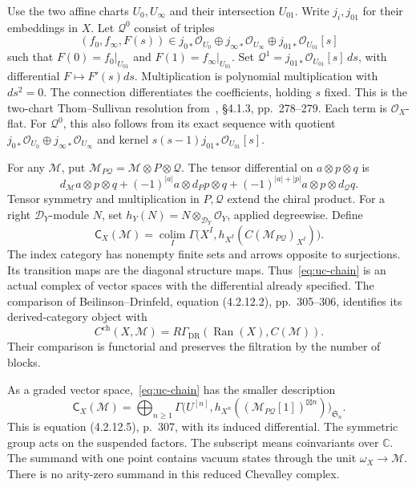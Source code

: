 Use the two affine charts $U_0,U_\infty$ and their intersection $U_{01}$.
Write $j_i,j_{01}$ for their embeddings in $X$.
Let $\mathcal Q^0$ consist of triples
\[
 (f_0,f_\infty,F(s))\in
 j_{0*}\mathcal O_{U_0}\oplus j_{\infty*}\mathcal O_{U_\infty}
 \oplus j_{01*}\mathcal O_{U_{01}}[s]
\]
such that $F(0)=f_0|_{U_{01}}$ and $F(1)=f_\infty|_{U_{01}}$.
Set $\mathcal Q^1=j_{01*}\mathcal O_{U_{01}}[s]\,ds$, with differential $F\mapsto F'(s)ds$.
Multiplication is polynomial multiplication with $ds^2=0$.
The connection differentiates the coefficients, holding $s$ fixed.
This is the two-chart Thom--Sullivan resolution from~\cite{BD026}, \S4.1.3, pp.~278--279.
Each term is $\mathcal O_X$-flat.
For $\mathcal Q^0$, this also follows from its exact sequence with quotient
$j_{0*}\mathcal O_{U_0}\oplus j_{\infty*}\mathcal O_{U_\infty}$ and kernel
$s(s-1)j_{01*}\mathcal O_{U_{01}}[s]$.

For any $\mathcal M$, put $\mathcal M_{P\mathcal Q}=\mathcal M\otimes P\otimes \mathcal Q$.
The tensor differential on $a\otimes p\otimes q$ is
\[
 d_\mathcal M a\otimes p\otimes q
 +(-1)^{|a|}a\otimes d_Pp\otimes q
 +(-1)^{|a|+|p|}a\otimes p\otimes d_{\mathcal Q}q.
\]
Tensor symmetry and multiplication in $P,\mathcal Q$ extend the chiral product.
For a right $\mathcal D_Y$-module $N$, set $h_Y(N)=N\otimes_{\mathcal D_Y}\mathcal O_Y$, applied degreewise.
Define
\begin{equation}\label{eq:uc-chain}
 \mathsf C_X(\mathcal M)
 =\underset{I}{\operatorname{colim}}
 \Gamma\bigl(X^I,h_{X^I}(C(\mathcal M_{P\mathcal Q})_{X^I})\bigr).
\end{equation}
The index category has nonempty finite sets and arrows opposite to surjections.
Its transition maps are the diagonal structure maps.
Thus~\eqref{eq:uc-chain} is an actual complex of vector spaces with the differential already specified.
The comparison of Beilinson--Drinfeld, equation (4.2.12.2), pp.~305--306, identifies its derived-category object with
\[
 C^{\mathrm{ch}}(X,\mathcal M)=R\Gamma_{\mathrm{DR}}(\operatorname{Ran}(X),C(\mathcal M)).
\]
Their comparison is functorial and preserves the filtration by the number of blocks.

As a graded vector space,~\eqref{eq:uc-chain} has the smaller description
\begin{equation}\label{eq:uc-small}
 \mathsf C_X(\mathcal M)
 =\bigoplus_{n\geq1}
 \Gamma\bigl(U^{[n]},h_{X^n}((\mathcal M_{P\mathcal Q}[1])^{\boxtimes n})\bigr)_{\mathfrak S_n}.
\end{equation}
This is equation (4.2.12.5), p.~307, with its induced differential.
The symmetric group acts on the suspended factors.
The subscript means coinvariants over $\mathbb C$.
The summand with one point contains vacuum states through the unit $\omega_X\to\mathcal M$.
There is no arity-zero summand in this reduced Chevalley complex.

